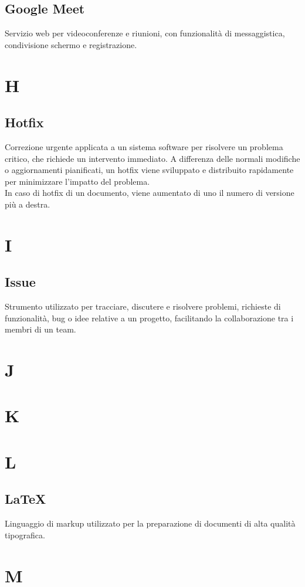    \subsection{Google Meet}    
    Servizio web per videoconferenze e riunioni, con funzionalità di messaggistica,
    condivisione schermo e registrazione.
\pagebreak
\section{H}
    \subsection{Hotfix}
    Correzione urgente applicata a un sistema software per risolvere un problema critico, 
    che richiede un intervento immediato. A differenza delle normali modifiche o aggiornamenti pianificati, 
    un hotfix viene sviluppato e distribuito rapidamente per minimizzare l'impatto del problema.\\
    In caso di hotfix di un documento, viene aumentato di uno il numero di versione più a destra.
\pagebreak
\section{I}
    \subsection{Issue}
    \label{Issue}
    Strumento utilizzato per tracciare, discutere e risolvere problemi, richieste di funzionalità, 
    bug o idee relative a un progetto, facilitando la collaborazione tra i membri di un team.
\pagebreak
\section{J}
\pagebreak
\section{K}
\pagebreak
\section{L}
    \subsection{LaTeX}
    \label{LaTeX}
    Linguaggio di markup utilizzato per la preparazione di documenti di alta qualità tipografica.
\pagebreak
\section{M}
